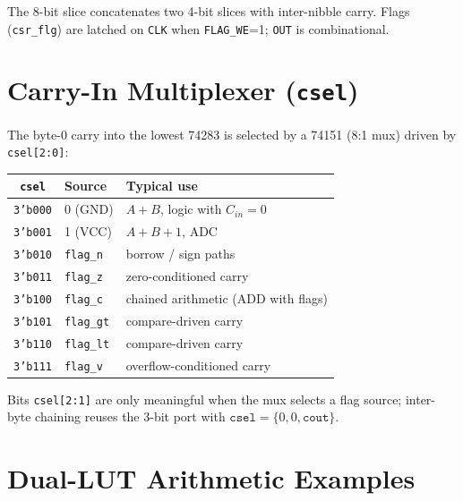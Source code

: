 \documentclass[10pt,a4paper]{article}
\begin{document}
The 8-bit slice concatenates two 4-bit slices with inter-nibble carry. Flags (\texttt{csr\_flg}) are latched on \texttt{CLK} when \texttt{FLAG\_WE}=1; \texttt{OUT} is combinational.

\section{Carry-In Multiplexer (\texttt{csel})}

The byte-0 carry into the lowest 74283 is selected by a 74151 (8:1 mux) driven by \texttt{csel[2:0]}:

\begin{center}
\scriptsize
\begin{tabular}{@{}cll@{}}
\toprule
\textbf{\texttt{csel}} & \textbf{Source} & \textbf{Typical use} \\
\midrule
\texttt{3'b000} & 0 (GND) & $A+B$, logic with $C_{in}=0$ \\
\texttt{3'b001} & 1 (VCC) & $A+B+1$, ADC \\
\texttt{3'b010} & \texttt{flag\_n} & borrow / sign paths \\
\texttt{3'b011} & \texttt{flag\_z} & zero-conditioned carry \\
\texttt{3'b100} & \texttt{flag\_c} & chained arithmetic (ADD with flags) \\
\texttt{3'b101} & \texttt{flag\_gt} & compare-driven carry \\
\texttt{3'b110} & \texttt{flag\_lt} & compare-driven carry \\
\texttt{3'b111} & \texttt{flag\_v} & overflow-conditioned carry \\
\bottomrule
\end{tabular}
\end{center}

Bits \texttt{csel[2:1]} are only meaningful when the mux selects a flag source; inter-byte chaining reuses the 3-bit port with $\texttt{csel}=\{0,0,\texttt{cout}\}$.

\section{Dual-LUT Arithmetic Examples}
\end{document}
